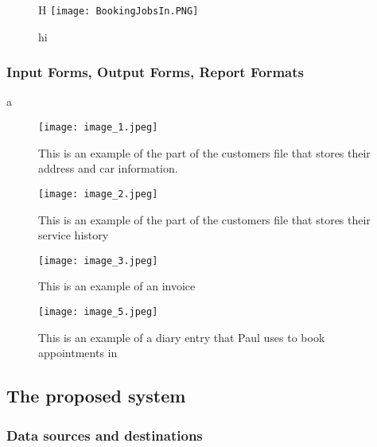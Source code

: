     \newpage
    
    \begin{figure}{H}
    \texttt{[image: BookingJobsIn.PNG]}
    \caption{hi}
    
    
    \end{figure}


	\subsubsection{Input Forms, Output Forms, Report Formats}
	
	a\begin{figure}[H]
	
	
	
	\texttt{[image: image\_1.jpeg]}
    \caption{This is an example of the part of the customers file that stores their address and car information.}
    
    \texttt{[image: image\_2.jpeg]}
    \caption{This is an example of the part of the customers file that stores their service history}
    
    \end{figure}
    \newpage
	
	
	\begin{figure}[H]
    
    
    \texttt{[image: image\_3.jpeg]}
    \caption{This is an example of an invoice}
    
    \end{figure}
    \newpage	
	
	\begin{figure}[H]  
    
    
    
    
    \texttt{[image: image\_5.jpeg]}
    \caption{This is an example of a diary entry that Paul uses to book appointments in}
    
    
	\end{figure}
	

	
		
	
	\subsection{The proposed system}
		

	\subsubsection{Data sources and destinations}


